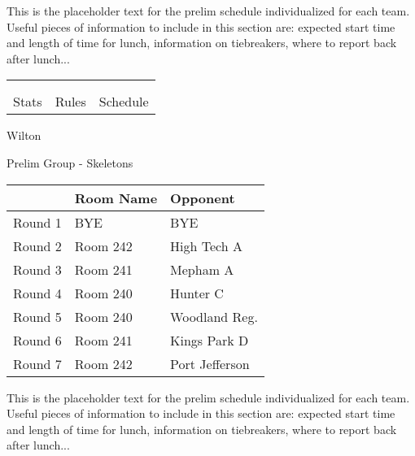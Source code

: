 \documentclass{article}%
\begin{document}
\vspace*{30pt}%
\linebreak%
This is the placeholder text for the prelim schedule individualized for each team. Useful pieces of information to include in this section are: expected start time and length of time for lunch, information on tiebreakers, where to report back after lunch...%
\vspace*{30pt}%
\newline%
%
\begin{tabularx}{\textwidth}{YYY}%
  &  &  \\%
\\%
Stats&Rules&Schedule\\%
\end{tabularx}%
\newpage%
%
\begin{center}%
\begin{Huge}%
Wilton%
\end{Huge}%
\vspace*{12pt}%
\linebreak%
\begin{Large}%
Prelim Group {-} Skeletons%
\end{Large}%
\end{center}%
\vspace*{4pt}%
\begin{tabularx}{\textwidth}{|c|Y|Y|}%
\hline%
&Room Name&Opponent\\%
\hline%
Round 1&BYE&BYE\\%
Round 2&Room 242&High Tech A\\%
Round 3&Room 241&Mepham A\\%
Round 4&Room 240&Hunter C\\%
Round 5&Room 240&Woodland Reg.\\%
Round 6&Room 241&Kings Park D\\%
Round 7&Room 242&Port Jefferson\\%
\hline%
\end{tabularx}%
\vspace*{30pt}%
\linebreak%
This is the placeholder text for the prelim schedule individualized for each team. Useful pieces of information to include in this section are: expected start time and length of time for lunch, information on tiebreakers, where to report back after lunch...%
\end{document}

